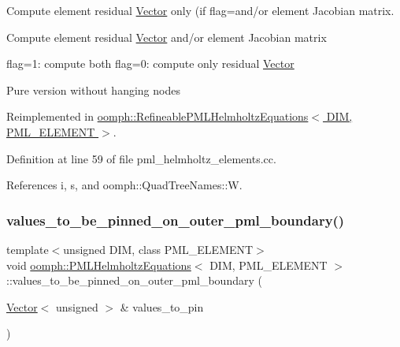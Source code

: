 Compute element residual \hyperlink{classoomph_1_1Vector}{Vector} only (if flag=and/or element Jacobian matrix. 

Compute element residual \hyperlink{classoomph_1_1Vector}{Vector} and/or element Jacobian matrix

flag=1\+: compute both flag=0\+: compute only residual \hyperlink{classoomph_1_1Vector}{Vector}

Pure version without hanging nodes 

Reimplemented in \hyperlink{classoomph_1_1RefineablePMLHelmholtzEquations_aac773b707acf42233bd8b65ca6af5d5f}{oomph\+::\+Refineable\+P\+M\+L\+Helmholtz\+Equations$<$ D\+I\+M, P\+M\+L\+\_\+\+E\+L\+E\+M\+E\+N\+T $>$}.



Definition at line 59 of file pml\+\_\+helmholtz\+\_\+elements.\+cc.



References i, s, and oomph\+::\+Quad\+Tree\+Names\+::W.

\mbox{\label{classoomph_1_1PMLHelmholtzEquations_af54422c30ac706500ac5ea8585bc70f5}} 
\subsubsection{\texorpdfstring{values\+\_\+to\+\_\+be\+\_\+pinned\+\_\+on\+\_\+outer\+\_\+pml\+\_\+boundary()}{values\_to\_be\_pinned\_on\_outer\_pml\_boundary()}}
{\footnotesize\ttfamily template$<$unsigned D\+IM, class P\+M\+L\+\_\+\+E\+L\+E\+M\+E\+NT$>$ \\
void \hyperlink{classoomph_1_1PMLHelmholtzEquations}{oomph\+::\+P\+M\+L\+Helmholtz\+Equations}$<$ D\+IM, P\+M\+L\+\_\+\+E\+L\+E\+M\+E\+NT $>$\+::values\+\_\+to\+\_\+be\+\_\+pinned\+\_\+on\+\_\+outer\+\_\+pml\+\_\+boundary (\begin{DoxyParamCaption}\item[{\hyperlink{classoomph_1_1Vector}{Vector}$<$ unsigned $>$ \&}]{values\+\_\+to\+\_\+pin }\end{DoxyParamCaption})\hspace{0.3cm}{\ttfamily [inline]}}



